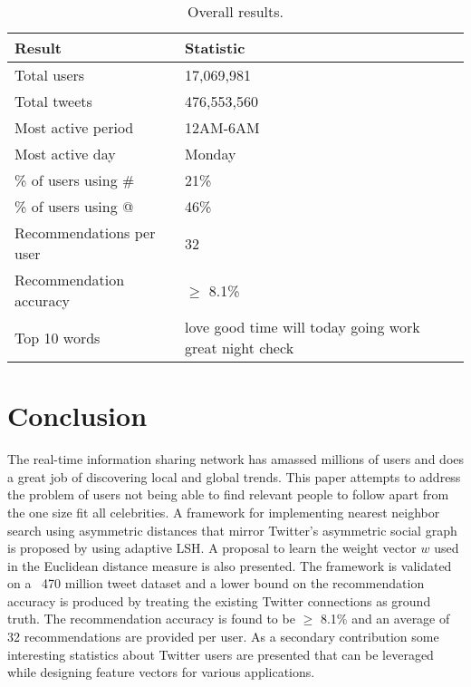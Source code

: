 \documentclass{article}
\begin{document}
\begin{table}
    \begin{center}
     \begin{tabular}{ | l | p{4cm}  | }
     \hline
     \textbf{Result} & \textbf{Statistic}   \\ \hline
     Total users & 17,069,981   \\ \hline
     Total tweets & 476,553,560   \\ \hline
     Most active period &  12AM-6AM \\ \hline
     Most active day &  Monday \\ \hline
     \% of users using \# & 21\%  \\ \hline
     \% of users using @ & 46\%   \\ \hline
     Recommendations per user  &  32  \\ \hline
     Recommendation accuracy  & $\geq$ 8.1\%  \\ \hline
     Top 10 words  & love good time will  today going work great night check\\ \hline
     \end{tabular}
     \caption{Overall results.}
     \label{tab:results}
     \end{center}
\end{table}

\section{Conclusion}

The real-time information sharing network has amassed millions of users
and does a great job of discovering local and global trends. 
This paper attempts to address the problem of users not being able to find
relevant people to follow apart from the one size fit all celebrities. A
framework for implementing nearest neighbor search using asymmetric distances
that mirror Twitter's asymmetric social graph is proposed by using 
adaptive LSH. A proposal to learn the weight vector $w$ used in
the Euclidean distance measure is also presented. The framework is 
validated on a ~470 million tweet dataset and a lower bound on the recommendation
accuracy is produced by treating the existing Twitter connections as ground truth.
The recommendation accuracy is found to be $\geq$ 8.1\% and an average of 32 recommendations
are provided per user. As a secondary contribution some interesting statistics
about Twitter users are presented that can be leveraged while designing 
feature vectors for various applications.



\end{document}
